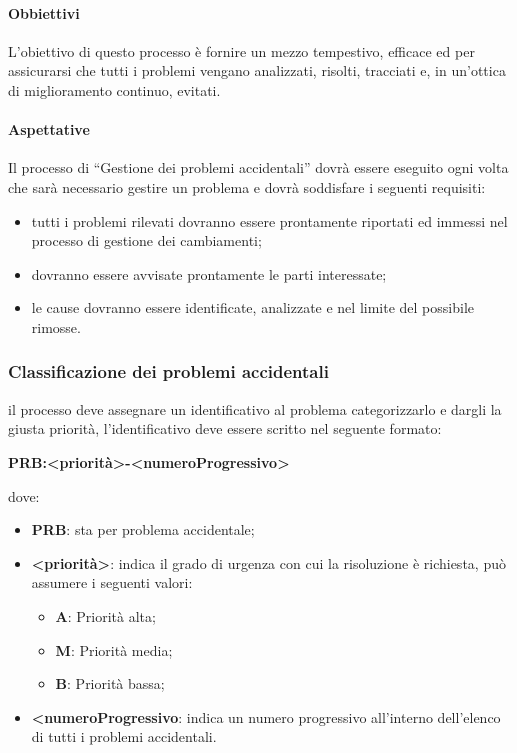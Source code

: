             \paragraph{Obbiettivi}
                L'obiettivo di questo processo è fornire un mezzo tempestivo, efficace ed per assicurarsi che tutti i problemi vengano analizzati, risolti, tracciati e, in un'ottica di miglioramento continuo, evitati.
            \paragraph{Aspettative}
            Il processo di “Gestione dei problemi accidentali” dovrà essere eseguito ogni volta che sarà necessario gestire un problema e dovrà soddisfare i seguenti requisiti: 
            \begin{itemize}
                \item tutti i problemi rilevati dovranno essere prontamente riportati ed immessi nel processo di gestione dei cambiamenti;
                \item dovranno essere avvisate prontamente le parti interessate;
                \item le cause dovranno essere identificate, analizzate e nel limite del possibile rimosse.
            \end{itemize}
        \subsubsection{Classificazione dei problemi accidentali}
            il processo deve assegnare un identificativo al problema categorizzarlo e dargli la giusta priorità, l’identificativo deve essere scritto nel seguente formato:
            \begin{center}
                \textbf{PRB:<priorità>-<numeroProgressivo>}
            \end{center}
            dove:
            \begin{itemize}
                \item\textbf{PRB}: sta per problema accidentale;
                \item\textbf{<priorità>}: indica il grado di urgenza con cui la risoluzione è richiesta, può assumere i seguenti valori:
                    \begin{itemize}
                        \item\textbf{A}: Priorità alta;
                        \item\textbf{M}: Priorità media;
                        \item\textbf{B}: Priorità bassa;
                    \end{itemize}
                \item\textbf{<numeroProgressivo}: indica un numero progressivo all’interno dell’elenco di tutti i problemi accidentali.
            \end{itemize}
